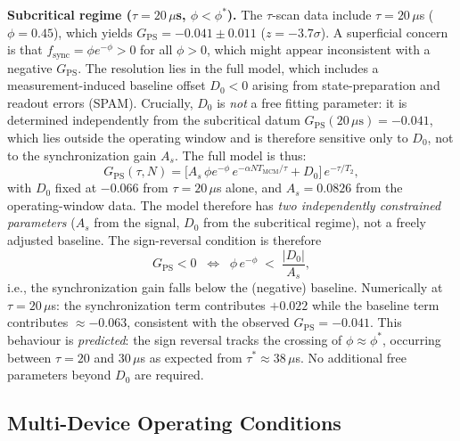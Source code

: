 \documentclass[10pt,twocolumn]{article}
\newcommand{\GPS}{G_{\mathrm{PS}}}
\newcommand{\Tmc}{T_{\mathrm{MCM}}}
\newcommand{\taustar}{\tau^*}
\begin{document}
\textbf{Subcritical regime ($\tau = 20\,\mu$s, $\phi < \phi^*$).}
The $\tau$-scan data include $\tau = 20\,\mu$s ($\phi = 0.45$),
which yields $\GPS = -0.041 \pm 0.011$ ($z = -3.7\sigma$).
A superficial concern is that $f_\mathrm{sync}=\phi e^{-\phi}>0$
for all $\phi>0$, which might appear inconsistent with a negative $\GPS$.
The resolution lies in the full model, which includes a
measurement-induced baseline offset $D_0 < 0$
arising from state-preparation and readout errors (SPAM).
Crucially, $D_0$ is \emph{not} a free fitting parameter:
it is determined independently from the subcritical datum
$\GPS(20\,\mu\mathrm{s}) = -0.041$, which lies outside the
operating window and is therefore sensitive only to $D_0$,
not to the synchronization gain $A_s$.
The full model is thus:
\begin{equation}
  \GPS(\tau,N)
  = \bigl[A_s\,\phi e^{-\phi}\,e^{-\alpha N\Tmc/\tau}
    + D_0\bigr]\,e^{-\tau/T_2},
  \label{eq:gps_full}
\end{equation}
with $D_0$ fixed at $-0.066$ from $\tau=20\,\mu$s alone,
and $A_s = 0.0826$ from the operating-window data.
The model therefore has \emph{two independently constrained parameters}
($A_s$ from the signal, $D_0$ from the subcritical regime),
not a freely adjusted baseline.
The sign-reversal condition is therefore
\begin{equation}
  \GPS < 0
  \;\;\Leftrightarrow\;\;
  \phi\,e^{-\phi} \;<\; \frac{|D_0|}{A_s},
  \label{eq:signreversal}
\end{equation}
i.e., the synchronization gain falls below the (negative) baseline.
Numerically at $\tau=20\,\mu$s:
the synchronization term contributes $+0.022$ while the baseline
term contributes $\approx -0.063$, consistent with the observed
$\GPS = -0.041$.
This behaviour is \emph{predicted}: the sign reversal tracks the crossing
of $\phi\approx\phi^*$, occurring between $\tau=20$ and $30\,\mu$s
as expected from $\taustar\approx38\,\mu$s.
No additional free parameters beyond $D_0$ are required.

\subsection{Multi-Device Operating Conditions}
\end{document}
